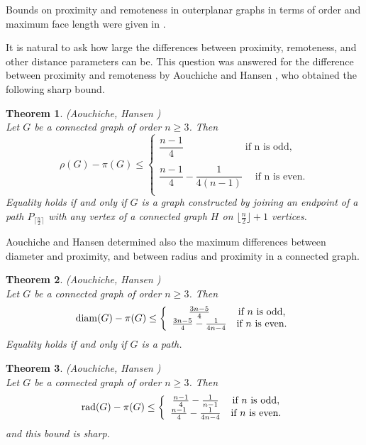 \documentclass[a4paper,11pt]{article}
\newtheorem{theorem}{Theorem}[section]
\begin{document}
Bounds on proximity and remoteness in outerplanar graphs in terms of order and maximum face length
were given in \cite{DanMafMal-manu}.

It is natural to ask how large the differences between proximity, remoteness,
and other distance parameters can be. 
This question was answered for the difference between proximity and remoteness by 
Aouchiche and Hansen \cite{AouHan2011}, who obtained the following sharp bound.


\begin{theorem} \label{theo:rho-vs-pi-given-n}
{\rm (Aouchiche, Hansen \cite{AouHan2011})} \\
Let $ G $ be a connected graph of order $ n \geq 3 $. Then
\[\rho(G) - \pi(G) \leq \left\{
 	\begin{array}{ll}
 	\dfrac{n - 1}{4}\;\quad\qquad\;\;\quad\;\;\;\;\;\mbox{if n is odd,}\\
 	\\
 	\dfrac{n - 1}{4} - \dfrac{1}{4(n - 1)}\;\quad\mbox{if n is even.}\\
 	\end{array}
 	\right.\]
Equality holds if and only if \( G \) is a graph constructed by joining an endpoint of a path 
$P_{\lceil \frac{n}{2} \rceil}$ with any vertex of a connected graph \( H \) on 
\( \lfloor \frac{n}{2} \rfloor + 1 \) vertices.
\end{theorem}

Aouchiche and Hansen \cite{AouHan2011} determined also the maximum differences  between diameter 
 and proximity, and between radius and proximity in a connected graph.

\begin{theorem} \label{theo:diameter-vs-pi-given-n}
{\rm (Aouchiche, Hansen \cite{AouHan2011})} \\
Let $G$ be a connected graph of order $n \geq 3$. Then 
\[ {\rm diam}(G) - \pi(G) \leq \left\{ \begin{array}{cc} 
    \frac{3n-5}{4} & \textrm{if $n$ is odd,} \\ 
    \frac{3n-5}{4} - \frac{1}{4n-4} & \textrm{if $n$ is even.} 
        \end{array} \right. \]
Equality holds if and only if $G$ is a path.             
\end{theorem}

\begin{theorem}  \label{theo:radius-vs-pi-given-n}
{\rm (Aouchiche, Hansen \cite{AouHan2011})} \\
Let $G$ be a connected graph of order $n \geq 3$. Then 
\[ {\rm rad}(G) - \pi(G) \leq \left\{ \begin{array}{cc} 
    \frac{n-1}{4} - \frac{1}{n-1} & \textrm{if $n$ is odd,} \\ 
    \frac{n-1}{4} - \frac{1}{4n-4} & \textrm{if $n$ is even.} 
        \end{array} \right. \]
and this bound is sharp.              
\end{theorem}
\end{document}
